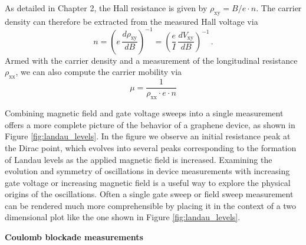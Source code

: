 \documentclass[edeposit,fullpage,draftthesis]{uiucthesis2009}
\begin{document}
            As detailed in Chapter 2, the Hall resistance is given by $\rho_\text{xy} = B / e \cdot n$.
            The carrier density can therefore be extracted from the measured Hall voltage via 
            \begin{equation}
                n = \left(e \, \frac{d\rho_\text{xy}}{dB}\right)^{-1} = \left(\frac{e}{I} \, \frac{dV_\text{xy}}{dB}\right)^{-1} \,.
            \end{equation}
            Armed with the carrier density and a measurement of the longitudinal resistance $\rho_\text{xx}$,
            we can also compute the carrier mobility via
            \begin{equation}
                \mu = \frac{1}{\rho_\text{xx} \cdot e \cdot n}
            \end{equation}
            
            Combining magnetic field and gate voltage sweeps into a single measurement offers a more complete picture
            of the behavior of a graphene device, as shown in Figure \ref{fig:landau_levels}. 
            In the figure we observe an initial resistance peak at the Dirac point, which evolves into several
            peaks corresponding to the formation of Landau levels as the applied magnetic field is increased.
            Examining the evolution and symmetry of oscillations in device measurements with increasing
            gate voltage or increasing magnetic field is a useful way to explore the physical origins of the oscillations.
            Often a single gate sweep or field sweep measurement can be rendered much more comprehensible by
            placing it in the context of a two dimensional plot like the one shown in Figure \ref{fig:landau_levels}.
            
           
            \textbf{Coulomb blockade measurements}
            
\end{document}
